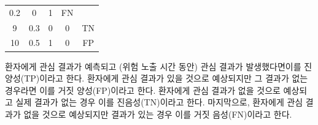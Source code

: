 \documentclass[11pt]{book}
\theoremstyle{definition}
\theoremstyle{definition}
\theoremstyle{definition}
\theoremstyle{remark}
\begin{document}
\begin{longtable}[]{@{}ccccc@{}}
\begin{minipage}[t]{0.14\columnwidth}
0.2\strut
\end{minipage} & \begin{minipage}[t]{0.14\columnwidth}\centering\strut
0\strut
\end{minipage} & \begin{minipage}[t]{0.14\columnwidth}\centering\strut
1\strut
\end{minipage} & \begin{minipage}[t]{0.11\columnwidth}\centering\strut
FN\strut
\end{minipage}\tabularnewline
\begin{minipage}[t]{0.12\columnwidth}\centering\strut
9\strut
\end{minipage} & \begin{minipage}[t]{0.14\columnwidth}\centering\strut
0.3\strut
\end{minipage} & \begin{minipage}[t]{0.14\columnwidth}\centering\strut
0\strut
\end{minipage} & \begin{minipage}[t]{0.14\columnwidth}\centering\strut
0\strut
\end{minipage} & \begin{minipage}[t]{0.11\columnwidth}\centering\strut
TN\strut
\end{minipage}\tabularnewline
\begin{minipage}[t]{0.12\columnwidth}\centering\strut
10\strut
\end{minipage} & \begin{minipage}[t]{0.14\columnwidth}\centering\strut
0.5\strut
\end{minipage} & \begin{minipage}[t]{0.14\columnwidth}\centering\strut
1\strut
\end{minipage} & \begin{minipage}[t]{0.14\columnwidth}\centering\strut
0\strut
\end{minipage} & \begin{minipage}[t]{0.11\columnwidth}\centering\strut
FP\strut
\end{minipage}\tabularnewline
\bottomrule
\end{longtable}

환자에게 관심 결과가 예측되고 (위험 노출 시간 동안) 관심 결과가
발생했다면이를 진양성(TP)이라고 한다. 환자에게 관심 결과가 있을 것으로
예상되지만 그 결과가 없는 경우라면 이를 거짓 양성(FP)이라고 한다.
환자에게 관심 결과가 없을 것으로 예상되고 실제 결과가 없는 경우 이를
진음성(TN)이라고 한다. 마지막으로, 환자에게 관심 결과가 없을 것으로
예상되지만 결과가 있는 경우 이를 거짓 음성(FN)이라고
한다.  
\end{document}
